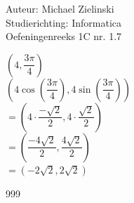 \documentclass[a4paper]{article}
\begin{document}
  
\noindent \large Auteur: Michael Zielinski \\
\noindent \large Studierichting: Informatica\\
\noindent \large Oefeningenreeks 1C nr. 1.7\\

\medskip

\normalsize

$\left(4, \dfrac{3\pi}{4}\right)$\\

$\left(4 \cos\left(\dfrac{3\pi}{4}\right), 4 \sin\left(\dfrac{3\pi}{4}\right)\right)$\\

$=\left(4 \cdot \dfrac{-\sqrt{2}}{2}, 4 \cdot \dfrac{\sqrt{2}}{2}\right)$\\

$=\left(\dfrac{-4\sqrt{2}}{2}, \dfrac{4\sqrt{2}}{2}\right)$\\

$=\left(-2\sqrt{2}, 2\sqrt{2}\right)$

\begin{thebibliography}{999}
\end{thebibliography}
\end{document}

